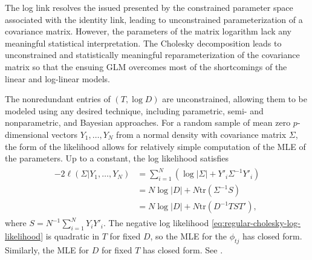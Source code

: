 The log link resolves the issued presented by the constrained parameter space associated with the identity link, leading to unconstrained parameterization of a covariance matrix. However, the parameters of the matrix logarithm lack any meaningful statistical interpretation. %
The Cholesky decomposition leads to unconstrained and statistically meaningful reparameterization of the covariance matrix so that the ensuing GLM overcomes most of the shortcomings of the linear and log-linear models.  %

%
The nonredundant entries of $\left(T, \log D\right)$ are unconstrained, allowing them to be modeled using any desired technique, including parametric, semi- and nonparametric, and Bayesian approaches. For a random sample of mean zero $p$-dimensional vectors $Y_1,\dots , Y_N$  from a normal density with covariance matrix $\Sigma$, the form of the likelihood allows for relatively simple computation of the MLE of the parameters. Up to a constant, the log likelihood satisfies
\begin{align}
\begin{split} \label{eq:regular-cholesky-log-likelihood}
-2\ell\left(\Sigma \vert Y_1,\dots, Y_N\right) &= \sum_{i = 1}^N \left( \log \vert \Sigma \vert  + Y'_i \Sigma^{-1}Y'_i\right) \\
&= N \log \vert D \vert + N \mbox{tr}\left(\Sigma^{-1}S\right) \\
& = N \log \vert D \vert + N \mbox{tr}\left(D^{-1}TST'\right), 
\end{split}
\end{align}
\noindent
where $S = N^{-1}\sum_{i=1}^N Y_iY'_i$. The negative log likelihood \eqref{eq:regular-cholesky-log-likelihood} is quadratic in $T$ for fixed $D$, so the MLE for the $\phi_{tj}$ has closed form. Similarly, the MLE for $D$ for fixed $T$ has closed form. See \cite{pourahmadi2000maximum}. 

